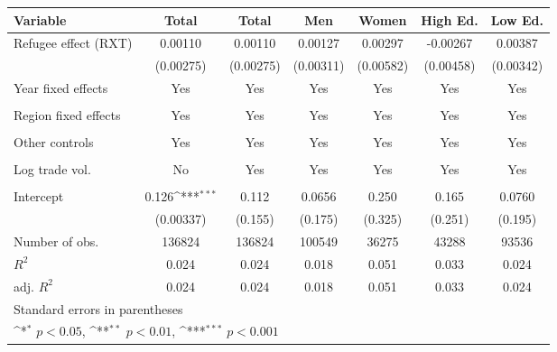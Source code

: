 \documentclass{article}
\begin{document}
{
\def\sym#1{\ifmmode^{#1}\else\(^{#1}\)\fi}
\begin{tabular}{l*{6}{c}}
\hline\hline
Variable
            &\multicolumn{1}{c}{Total}&\multicolumn{1}{c}{Total}&\multicolumn{1}{c}{Men}&\multicolumn{1}{c}{Women}&\multicolumn{1}{c}{High Ed.}&\multicolumn{1}{c}{Low Ed.}\\
\hline
Refugee effect (RXT)         &     0.00110         &     0.00110         &     0.00127         &     0.00297         &    -0.00267         &     0.00387         \\
            &   (0.00275)         &   (0.00275)         &   (0.00311)         &   (0.00582)         &   (0.00458)         &   (0.00342)         \\
[1em]
Year fixed effects         &     Yes&     Yes&                     Yes&                     Yes&     Yes&     Yes\\
            &            &            &                     &                     &            &            \\
[1em]
Region fixed effects     &     Yes&     Yes&     Yes&      Yes&     Yes&    Yes \\
            &            &            &            &           &           &           \\
[1em]
Other controls       &      Yes&      Yes&      Yes&      Yes&      Yes&      Yes\\
            &            &           &            &            &            &            \\
[1em]
Log trade vol.   &                    No &   Yes        &     Yes         &    Yes         &    Yes         &    Yes         \\
            &                     &            &            &            &             &          \\
[1em]
Intercept      &       0.126\sym{***}&       0.112         &      0.0656         &       0.250         &       0.165         &      0.0760         \\
            &   (0.00337)         &     (0.155)         &     (0.175)         &     (0.325)         &     (0.251)         &     (0.195)         \\
\hline
Number of obs.       &      136824         &      136824         &      100549         &       36275         &       43288         &       93536         \\
\(R^{2}\)   &       0.024         &       0.024         &       0.018         &       0.051         &       0.033         &       0.024         \\
adj. \(R^{2}\)&       0.024         &       0.024         &       0.018         &       0.051         &       0.033         &       0.024         \\
\hline\hline
\multicolumn{7}{l}{\footnotesize Standard errors in parentheses}\\
\multicolumn{7}{l}{\footnotesize \sym{*} \(p<0.05\), \sym{**} \(p<0.01\), \sym{***} \(p<0.001\)}\\
\end{tabular}
}
\end{document}
